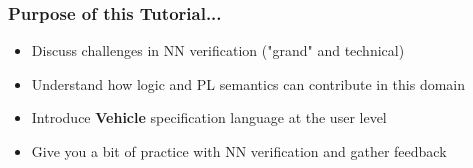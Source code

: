 \documentclass[t,compress,aspectratio=169]{beamer}
\begin{document}
\begin{frame}
\frametitle{Purpose of this Tutorial...}

\begin{block}{}
\begin{itemize}

\item Discuss challenges in NN verification ("grand" and technical)

\item Understand how logic and PL semantics can contribute in this domain

\item Introduce \textbf{Vehicle} specification language at the user level

\item Give you a  bit of practice with NN verification and gather feedback 
\end{itemize}
\end{block}

\end{frame}
\end{document}
